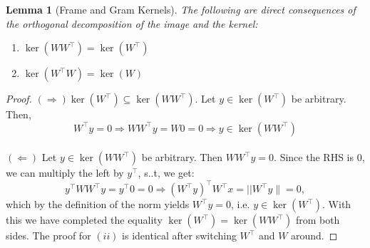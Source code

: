 \documentclass{article}
\theoremstyle{plain}
\newtheorem{lemma}{Lemma}[section]
\numberwithin{equation}{section}
\theoremstyle{definition}
\theoremstyle{remark}
\begin{document}
\begin{lemmaproofbox}
    \begin{lemma}[Frame and Gram Kernels]\label{lemma:kernels} The following are direct consequences of the orthogonal decomposition of the image and the kernel:
 \begin{enumerate}[label=(\roman*)]
           \item $ \ker (WW^\top)= \ker (W^\top)$
           \item $\ker (W^\top W) = \ker (W)$
       \end{enumerate}
    \end{lemma}
    \begin{proof}
         $(\Rightarrow) \ker (W^\top) \subseteq \ker(WW^\top)$. 
Let $y\in \ker(W^\top)$ be arbitrary. Then, $$W^\top y = 0\Rightarrow WW^\top y = W0 = 0\Rightarrow y\in \ker (WW^\top)$$\\
$(\Leftarrow)$ Let $y\in \ker(WW^\top)$ be arbitrary. Then $WW^\top y = 0$. Since the RHS is $0$, we can multiply the left by $y^\top$, s..t, we get: $$y^\top WW^\top y = y^\top 0 = 0\Rightarrow (W^\top y)^\top W^\top x=||W^\top y\|= 0,$$
which by the definition of the norm yields $W^\top y = 0$, i.e. $y\in \ker(W^\top)$. With this we have completed the equality $\ker(W^\top) = \ker(WW^\top)$ from both sides. The proof for $(ii)$ is identical after switching $W^\top$ and $W$ around. 
    \end{proof}
\end{lemmaproofbox}
\end{document}

